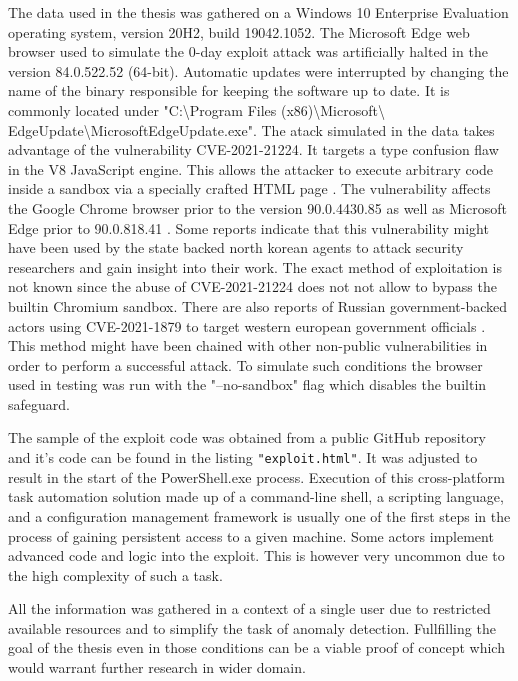 \documentclass[a4paper,twoside,12pt]{book}
\begin{document}
The data used in the thesis was gathered on a Windows 10 Enterprise Evaluation operating 
system, version 20H2, build 19042.1052. The Microsoft Edge web browser used to simulate 
the 0-day exploit attack was artificially halted in the version 84.0.522.52 (64-bit). 
Automatic updates were interrupted by changing the name of the binary responsible for 
keeping the software up to date. It is commonly located under 
"C:\textbackslash Program Files (x86)\textbackslash Microsoft\textbackslash 
EdgeUpdate\textbackslash MicrosoftEdgeUpdate.exe". 
The atack simulated in the data takes advantage of the vulnerability CVE-2021-21224. It 
targets a type confusion flaw in the V8 JavaScript engine. This allows the attacker to 
execute arbitrary code inside a sandbox via a specially crafted HTML page \cite{bib:CVE21224}. 
The vulnerability affects the Google Chrome browser prior to the version 90.0.4430.85 as 
well as Microsoft Edge prior to 90.0.818.41 \cite{bib:edgeRelease}. Some reports indicate 
that this vulnerability might have been used by the state backed north korean agents to 
attack security researchers and gain insight into their work. The exact method of
exploitation is not known since the abuse of CVE-2021-21224 does not not allow to bypass 
the builtin Chromium sandbox. There are also reports of Russian government-backed actors 
using CVE-2021-1879 to target western european government officials \cite{bib:googleBlog}. 
This method might have been chained with other non-public vulnerabilities in order to 
perform a successful attack. To simulate such conditions the browser used in testing was 
run with the "--no-sandbox" flag which disables the builtin safeguard.

The sample of the exploit code was obtained from a public GitHub repository 
\cite{bib:sampleExploit} and it's code can be found in the listing \lstinline|"exploit.html"|. 
It was adjusted to result in the start of the PowerShell.exe process. Execution of this 
cross-platform task automation solution made up of a command-line shell, a scripting 
language, and a configuration management framework is usually one of the first steps in 
the process of gaining persistent access to a given machine. Some actors implement advanced 
code and logic into the exploit. This is however very uncommon due to the high complexity 
of such a task.

All the information was gathered in a context of a single user due to restricted available
resources and to simplify the task of anomaly detection. Fullfilling the goal of the thesis
even in those conditions can be a viable proof of concept which would warrant further 
research in wider domain.  
\end{document}
